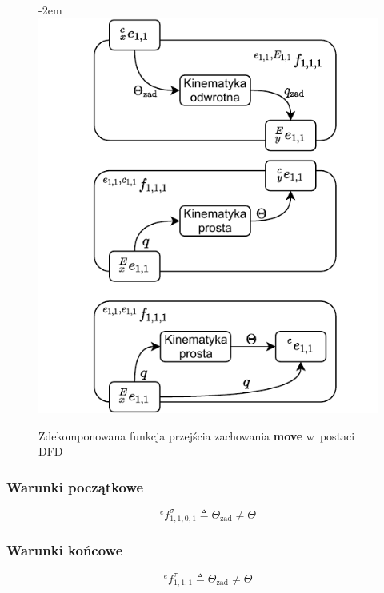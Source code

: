 \begin{figure}[ht]
    \leftskip-2em
    \includegraphics[width=1.1\columnwidth]{figures/ISR-ve-manip-fp-move.pdf}
    \caption{Zdekomponowana funkcja przejścia zachowania \textbf{move} w~postaci DFD}
    \label{fig:ve-manip-fp-move}
\end{figure}

\subsubsection{Warunki początkowe}
\begin{equation}
    {}^{e}f^{\sigma}_{1,1,0,1} \triangleq \Theta_{\mathrm{zad}} \neq \Theta
\end{equation}

\subsubsection{Warunki końcowe}
\begin{equation}
    {}^{e}f^{\tau}_{1,1,1} \triangleq \Theta_{\mathrm{zad}} \neq \Theta
\end{equation}

